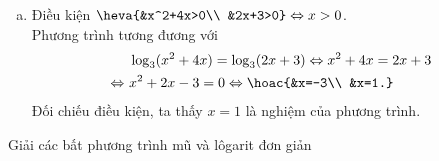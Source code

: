 \begin{vd}
{\begin{enumerate}[a)]
			\item Điều kiện $\heva{&x^2+4x>0\\ &2x+3>0}\Leftrightarrow x>0$.\\
			Phương trình tương đương với
			\begin{align*}
				&\ \log_3(x^2+4x)=\log_3(2x+3)\Leftrightarrow x^2+4x=2x+3\\
				\Leftrightarrow &\ x^2+2x-3=0\Leftrightarrow \hoac{&x=-3\\ &x=1.}
			\end{align*}
			Đối chiếu điều kiện, ta thấy $x=1$ là nghiệm của phương trình.
	\end{enumerate}}
\end{vd} 

\begin{dang}{Giải các bất phương trình mũ và lôgarit đơn giản}
\end{dang}
